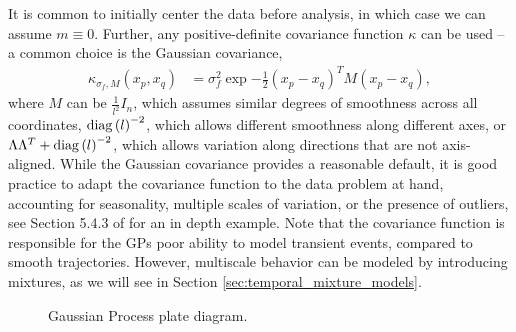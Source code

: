 \documentclass[14pt]{extreport}
\begin{document}
It is common to initially center the data before analysis, in which case we can
assume $m \equiv 0$. Further, any positive-definite covariance function $\kappa$
can be used -- a common choice is the Gaussian covariance,
\begin{align*}
\kappa_{\sigma_{f}, M}\left(x_{p}, x_{q}\right) &= \sigma_{f}^{2}\exp{-\frac{1}{2}\left(x_{p} - x_{q}\right)^{T}M\left(x_{p} - x_{q}\right)},
\end{align*}
where $M$ can be $\frac{1}{l^{2}}I_{n}$, which assumes similar degrees of
smoothness across all coordinates, $\mathop\mathrm{diag}\left(l\right)^{-2}$, which allows
different smoothness along different axes, or $\Lambda \Lambda^{T} +
\mathop\mathrm{diag}\left(l\right)^{-2}$, which allows variation along directions that are not
axis-aligned. While the Gaussian covariance provides a reasonable default, it is
good practice to adapt the covariance function to the data problem at hand,
accounting for seasonality, multiple scales of variation, or the presence of
outliers, see Section 5.4.3 of \citep{rasmussen2006gaussian} for an in depth
example. Note that the covariance function is responsible for the GPs poor
ability to model transient events, compared to smooth trajectories. However,
multiscale behavior can be modeled by introducing mixtures, as we will see in
Section \ref{sec:temporal_mixture_models}.

\begin{figure}
  \centering

  \caption{Gaussian Process plate diagram.\label{fig:gp_plate} }
\end{figure}
\end{document}
